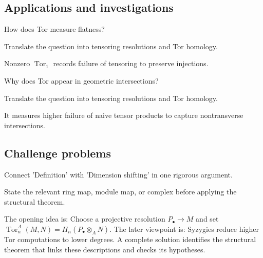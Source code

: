 \subsection*{Applications and investigations}

\begin{exercise}\label{exr:v26-expand-13}
How does Tor measure flatness?
\end{exercise}
\begin{hint}
Translate the question into tensoring resolutions and Tor homology.
\end{hint}
\begin{solution}
Nonzero $\operatorname{Tor}_1$ records failure of tensoring to preserve injections.
\end{solution}

\begin{exercise}\label{exr:v26-expand-14}
Why does Tor appear in geometric intersections?
\end{exercise}
\begin{hint}
Translate the question into tensoring resolutions and Tor homology.
\end{hint}
\begin{solution}
It measures higher failure of naive tensor products to capture nontransverse intersections.
\end{solution}

\subsection*{Challenge problems}

\begin{exercise}\label{exr:v26-expand-15}
Connect 'Definition' with 'Dimension shifting' in one rigorous argument.
\end{exercise}
\begin{hint}
State the relevant ring map, module map, or complex before applying the structural theorem.
\end{hint}
\begin{solution}
The opening idea is: Choose a projective resolution $P_\bullet\to M$ and set $\operatorname{Tor}_n^A(M,N)=H_n(P_\bullet\otimes_A N)$. The later viewpoint is: Syzygies reduce higher Tor computations to lower degrees. A complete solution identifies the structural theorem that links these descriptions and checks its hypotheses.
\end{solution}

